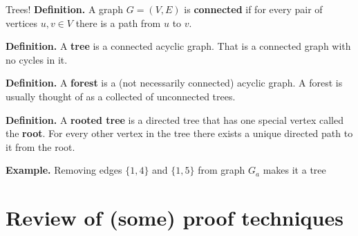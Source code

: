 \documentclass[10pt]{beamer}
\begin{document}
\begin{frame}{Trees!}
    \textbf{Definition.} A graph $G=(V, E)$ is \textbf{connected} if for every pair of vertices $u, v \in V$ there is a path from $u$ to $v$.

    \textbf{Definition.} A \textbf{tree} is a connected acyclic graph. That is a connected graph with no cycles in it.

    \textbf{Definition.} A \textbf{forest} is a (not necessarily connected) acyclic graph. A forest is usually thought of as a collected of unconnected trees.

    \textbf{Definition.} A \textbf{rooted tree} is a directed tree that has one special vertex called the \textbf{root}. For every other vertex in the tree there exists a unique directed path to it from the root.

    \textbf{Example.} Removing edges $\{1,4\}$ and $\{1,5\}$ from graph $G_a$ makes it a tree

    \begin{figure}
        \centering
        \vspace{-5mm}
        \begin{minipage}{0.4\textwidth}
            \centering
        \end{minipage}\hfill
    \end{figure}
\end{frame}

\section{Review of (some) proof techniques}
\end{document}
